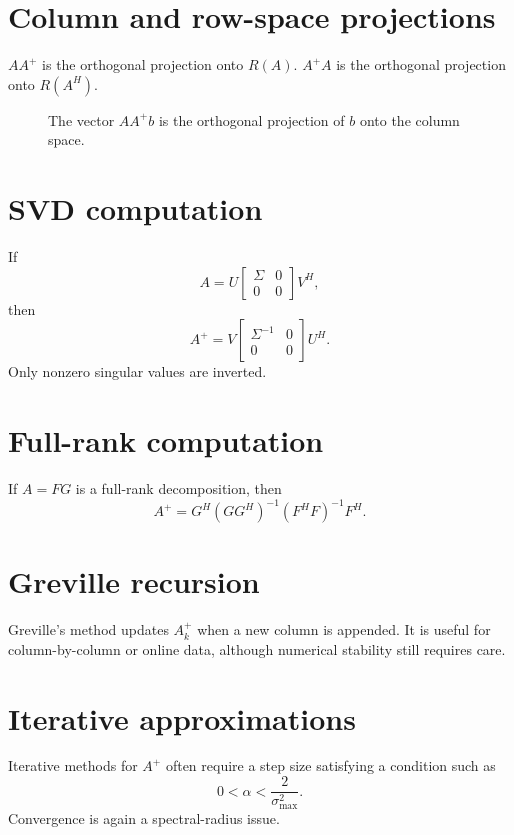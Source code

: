 \section{Column and row-space projections}
\(AA^+\) is the orthogonal projection onto \(R(A)\).  \(A^+A\) is the orthogonal projection onto \(R(A^H)\).

\begin{figure}[H]
\centering
{}
\caption{The vector \(AA^+b\) is the orthogonal projection of \(b\) onto the column space.}
\end{figure}

\section{SVD computation}
If
\[
  A=U\begin{bmatrix}\Sigma&0\\0&0\end{bmatrix}V^H,
\]
then
\[
  A^+=V\begin{bmatrix}\Sigma^{-1}&0\\0&0\end{bmatrix}U^H.
\]
Only nonzero singular values are inverted.

\section{Full-rank computation}
If \(A=FG\) is a full-rank decomposition, then
\[
  A^+=G^H(GG^H)^{-1}(F^HF)^{-1}F^H.
\]

\section{Greville recursion}
Greville's method updates \(A_k^+\) when a new column is appended.  It is useful for column-by-column or online data, although numerical stability still requires care.

\section{Iterative approximations}
Iterative methods for \(A^+\) often require a step size satisfying a condition such as
\[
  0<\alpha<\frac{2}{\sigma_{\max}^2}.
\]
Convergence is again a spectral-radius issue.

